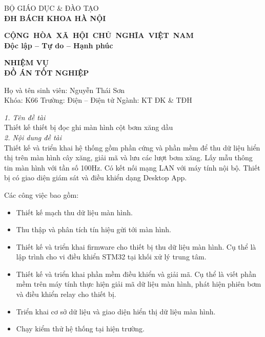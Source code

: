 \begin{multicols}{2}
\centering
\hspace{-3cm}BỘ GIÁO DỤC \& ĐÀO TẠO \\ \hspace{-3cm}\textbf{ĐH BÁCH KHOA HÀ NỘI}

\columnbreak

\hspace{-1.6cm}\textbf{CỘNG~HÒA~XÃ~HỘI~CHỦ~NGHĨA~VIỆT~NAM} \\ \hspace{-1.6cm}\textbf{Độc lập -- Tự do -- Hạnh phúc}

\end{multicols}

\begin{center}
   \textbf{NHIỆM VỤ \\ĐỒ ÁN TỐT NGHIỆP} 
\end{center}


\hspace{-1cm}Họ và tên sinh viên: Nguyễn Thái Sơn\\Khóa: K66 \hfill Trường: Điện -- Điện tử \hfill Ngành: KT ĐK \& TĐH
    
    
    \hspace{-1cm}\textit{1. Tên đề tài}\\
             Thiết kế thiết bị đọc ghi màn hình cột bơm xăng dầu  \\[0.2cm]
    \textit{2. Nội dung đề tài}\\
            Thiết kế và triển khai hệ thống gồm phần cứng và phần mềm
            để thu dữ liệu hiển thị trên màn hình cây xăng, giải mã
            và lưu các lượt bơm xăng. Lấy mẫu thông tin màn hình với tần số 100Hz. Có kết nối mạng LAN với máy tính nội bộ. Thiết bị có giao diện giám sát và điều khiển dạng Desktop App.

            Các công việc bao gồm:
            \begin{itemize}
                \item Thiết kế mạch thu dữ liệu màn hình.
                \item Thu thập và phân tích tín hiệu gửi tới màn hình.
                \item Thiết kế và triển khai firmware cho thiết bị thu dữ liệu màn hình. Cụ thể là lập trình cho vi điều khiển STM32 tại khối xử lý trung tâm.
                \item Thiết kế và triển khai phần mềm điều khiển và giải mã. Cụ thể là viết phần mềm trên máy tính thực hiện giải mã dữ liệu màn hình, phát hiện phiên bơm và điều khiển relay cho thiết bị.
                \item Triển khai cơ sở dữ liệu và giao diện hiển thị dữ liệu màn hình.
                \item Chạy kiểm thử hệ thống tại hiện trường.
            \end{itemize}
           
